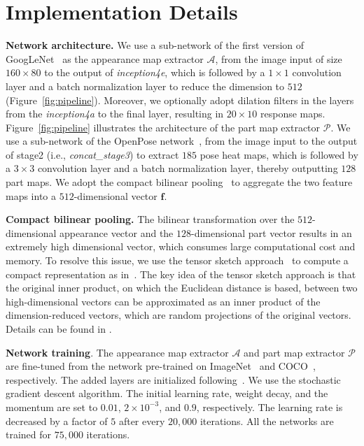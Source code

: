 \documentclass{llncs}
\begin{document}
\section{Implementation Details}
\label{section:implementation_details}
\noindent\textbf{Network architecture.}
We use a sub-network of the first version of GoogLeNet~\cite{googlenet} as the appearance map extractor $\mathcal{A}$, 
from the image input of size $160 \times 80$ to the output of \textit{inception4e}, which is followed by a $1\times 1$ convolution layer and a batch normalization layer to reduce the dimension to $512$ (Figure~\ref{fig:pipeline}). Moreover, we optionally adopt dilation filters in the layers from the \textit{inception4a} to the final layer, resulting in $20 \times 10$ response maps. Figure~\ref{fig:pipeline} illustrates the architecture of the part map extractor $\mathcal{P}$. We use a sub-network of the OpenPose network~\cite{conf/cvpr/cao17}, from the image input to the output of stage2 (i.e., \textit{concat\_stage3}) to extract $185$ pose heat maps, which is followed by a $3\times 3$ convolution layer and a batch normalization layer, thereby outputting $128$ part maps. 
We adopt the compact bilinear pooling~\cite{conf/cvpr/gao16} to aggregate the two feature maps into a $512$-dimensional vector $\mathbf{f}$.

\vspace{0.1cm}
\noindent\textbf{Compact bilinear pooling.}
The bilinear transformation
over the $512$-dimensional appearance vector
and the $128$-dimensional part vector
results in an extremely high dimensional vector,
which consumes large computational cost and memory.
To resolve this issue, we use the tensor sketch approach~\cite{TensorSketch}
to compute a compact representation
as in~\cite{conf/cvpr/gao16}.
The key idea of the tensor sketch approach is that
the original inner product,
on which the Euclidean distance is based,
between two high-dimensional vectors can be approximated
as an inner product of the dimension-reduced vectors,
which are random projections of the original vectors.
Details can be found in \cite{TensorSketch}.

\vspace{0.1cm}
\noindent\textbf{Network training}.
The appearance map extractor $\mathcal{A}$ and part map extractor $\mathcal{P}$ are fine-tuned from the network pre-trained on ImageNet~\cite{imagenet} and COCO~\cite{coco}, respectively. The added layers are initialized following~\cite{xavier}.
We use the stochastic gradient descent algorithm.
The initial learning rate, weight decay, and the momentum are set to $0.01$, $2 \times 10^{-3}$, and $0.9$, respectively.
The learning rate is decreased by a factor of $5$ after every $20,000$ iterations.
All the networks are trained for $75,000$ iterations.
\end{document}
